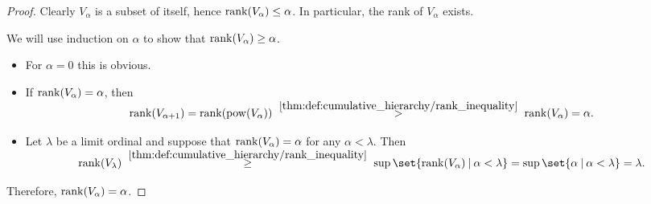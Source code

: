 \begin{proof}
   Clearly \( V_\alpha \) is a subset of itself, hence \( \operatorname{rank}(V_\alpha) \leq \alpha \). In particular, the rank of \( V_\alpha \) exists.

  We will use induction on \( \alpha \) to show that \( \operatorname{rank}(V_\alpha) \geq \alpha \).
  \begin{itemize}
    \item For \( \alpha = 0 \) this is obvious.
    \item If \( \operatorname{rank}(V_\alpha) = \alpha \), then
    \begin{equation*}
      \rank(V_{\alpha + 1})
      =
      \rank(\pow(V_\alpha))
      \reloset {\ref{thm:def:cumulative_hierarchy/rank_inequality}} >
      \rank(V_\alpha)
      =
      \alpha.
    \end{equation*}

    \item Let \( \lambda \) be a limit ordinal and suppose that \( \operatorname{rank}(V_\alpha) = \alpha \) for any \( \alpha < \lambda \). Then
    \begin{equation*}
      \rank(V_\lambda)
      \reloset {\ref{thm:def:cumulative_hierarchy/rank_inequality}} \geq
      \sup\set{ \rank(V_\alpha) \given \alpha < \lambda }
      =
      \sup\set{ \alpha \given \alpha < \lambda }
      =
      \lambda.
    \end{equation*}
  \end{itemize}

  Therefore, \( \operatorname{rank}(V_\alpha) = \alpha \).
\end{proof}

